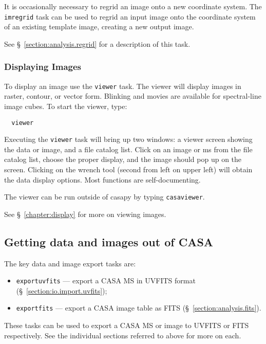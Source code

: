 It is occasionally necessary to regrid an image onto a new
coordinate system.  The {\tt imregrid} task can be used
to regrid an input image onto the coordinate system of an
existing template image, creating a new output image.

See \S~\ref{section:analysis.regrid} for a description of
this task.

\subsubsection{Displaying Images}
\label{section:intro.walkthru.analysis.display}

To display an image use the {\tt viewer} task.  The viewer will
display images in raster, contour, or vector form.  Blinking and
movies are available for spectral-line image cubes.  To start the
viewer, type:

\small
\begin{verbatim}
  viewer
\end{verbatim}
\normalsize

Executing the {\tt viewer} task will bring up two windows: a viewer
screen showing the data or image, and a file catalog list. Click on an
image or ms from the file catalog list, choose the proper display, and
the image should pop up on the screen. Clicking on the wrench
tool (second from left on upper left) will obtain the data display
options. Most functions are self-documenting. 

The viewer can be run outside of casapy by typing {\tt casaviewer}. 

See \S~\ref{chapter:display} for more on viewing images.

\subsection{Getting data and images out of CASA}
\label{section:intro.walkthru.export}

The key data and image export tasks are:
\begin{itemize}
   \item {\tt exportuvfits} --- export a CASA MS in UVFITS format 
         (\S~\ref{section:io.import.uvfits});
   \item {\tt exportfits} --- export a CASA image table as FITS 
         (\S~\ref{section:analysis.fits}).
\end{itemize}

These tasks can be used to export a CASA MS or image to UVFITS
or FITS respectively.  See the individual sections referred to
above for more on each.

